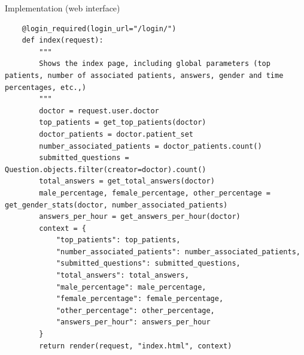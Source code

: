 \documentclass{beamer}
\begin{document}
\begin{frame}[fragile]{Implementation (web interface)}
  \begin{verbatim}
    @login_required(login_url="/login/")
    def index(request):
        """
        Shows the index page, including global parameters (top patients, number of associated patients, answers, gender and time percentages, etc.,)
        """
        doctor = request.user.doctor
        top_patients = get_top_patients(doctor)
        doctor_patients = doctor.patient_set
        number_associated_patients = doctor_patients.count()
        submitted_questions = Question.objects.filter(creator=doctor).count()
        total_answers = get_total_answers(doctor)
        male_percentage, female_percentage, other_percentage = get_gender_stats(doctor, number_associated_patients)
        answers_per_hour = get_answers_per_hour(doctor)
        context = {
            "top_patients": top_patients,
            "number_associated_patients": number_associated_patients,
            "submitted_questions": submitted_questions,
            "total_answers": total_answers,
            "male_percentage": male_percentage,
            "female_percentage": female_percentage,
            "other_percentage": other_percentage,
            "answers_per_hour": answers_per_hour
        }
        return render(request, "index.html", context)
  \end{verbatim}
\end{frame}
\end{document}
